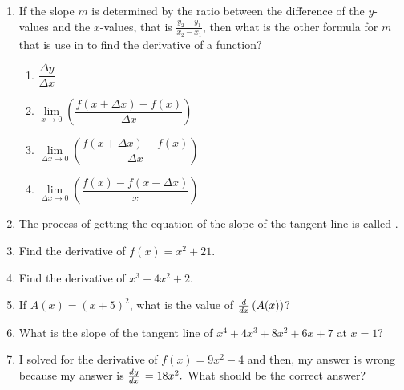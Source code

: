 \documentclass[10pt,paper=letter]{scrartcl}
\begin{document}
\begin{enumerate}[label=\arabic*.,font=\bfseries]

\item If the slope $m$ is determined by the ratio between the difference of the $y$-values and the $x$-values, that is $\frac{y_2 - y_1}{x_2 - x_1}$, then what is the other formula for $m$ that is use in  to find the derivative of a function?

\begin{enumerate}

\item[(a)] {$\dfrac{\Delta y}{\Delta x}$}

\item[(b)] {$\displaystyle \mathop {\lim }\limits_{x \to 0} \left(\dfrac{f(x + \Delta x) - f(x)}{\Delta x}\right)$}

\item[(c)] {$\displaystyle \mathop {\lim }\limits_{\Delta x \to 0} \left(\dfrac{f(x + \Delta x) - f(x)}{\Delta x}\right)$}

\item[(d)] {$\displaystyle \mathop {\lim }\limits_{\Delta x \to 0} \left(\dfrac{f(x) - f(x + \Delta x)}{x}\right)$}


\end{enumerate}

\item The process of getting the equation of the slope of the
tangent line is called \enspace\hrulefill. 


\item Find the derivative of $f(x) = x^2 + 21$.


\item Find the derivative of $x^3 - 4x^2 + 2$.


\item If $A(x) = (x+5)^2$, what is the value of $\frac{d}{dx}\, (A(x))$?


\item What is the slope of the tangent line of $x^4 + 4x^3 + 8x^2 + 6x + 7$ at $x=1$?


\item I solved for the derivative of $f(x) = 9x^2 - 4$ and then, my answer is wrong because my answer is $\frac{dy}{dx}\, = 18x^2.$ What should be the correct answer?


\end{enumerate}
\end{document}
